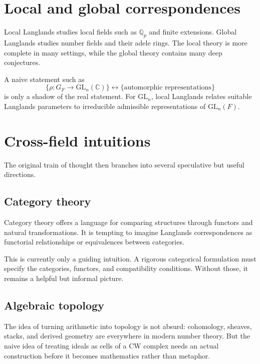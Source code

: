 \section{Local and global correspondences}

Local Langlands studies local fields such as \(\mathbb Q_p\) and finite extensions.  Global Langlands studies number fields and their adele rings.  The local theory is more complete in many settings, while the global theory contains many deep conjectures.

\begin{caution}
A naive statement such as
\[
  \{\rho:G_F\to\mathrm{GL}_n(\mathbb C)\}
  \longleftrightarrow
  \{\text{automorphic representations}\}
\]
is only a shadow of the real statement.  For \(\mathrm{GL}_n\), local Langlands relates suitable Langlands parameters to irreducible admissible representations of \(\mathrm{GL}_n(F)\).
\end{caution}

\section{Cross-field intuitions}

The original train of thought then branches into several speculative but useful directions.

\subsection{Category theory}

Category theory offers a language for comparing structures through functors and natural transformations.  It is tempting to imagine Langlands correspondences as functorial relationships or equivalences between categories.

\begin{gap}
This is currently only a guiding intuition.  A rigorous categorical formulation must specify the categories, functors, and compatibility conditions.  Without those, it remains a helpful but informal picture.
\end{gap}

\subsection{Algebraic topology}

The idea of turning arithmetic into topology is not absurd: cohomology, sheaves, stacks, and derived geometry are everywhere in modern number theory.  But the naive idea of treating ideals as cells of a CW complex needs an actual construction before it becomes mathematics rather than metaphor.

